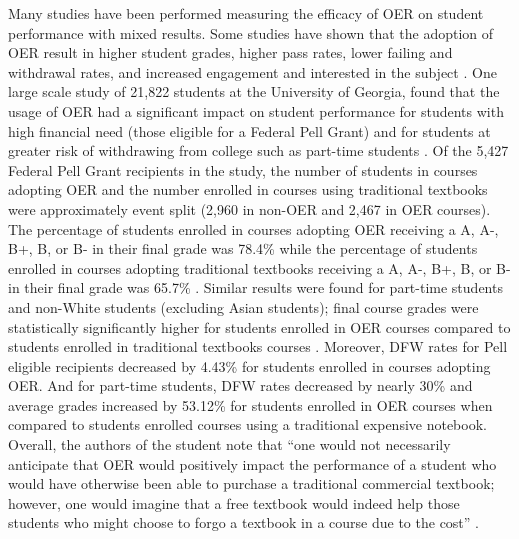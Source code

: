 \documentclass[11pt]{article}
\begin{document}
Many studies have been performed measuring the efficacy of OER on student performance with mixed results.  Some studies have shown that the adoption of OER result in higher student grades, higher pass rates, lower failing and withdrawal rates, and increased engagement and interested in the subject \cite{AF-MM:12, RF-RP-BD:15, LF-JH:15, RP:15, NP-DB:13, CB-WC-PH:18}.  One large scale study of 21,822 students at the University of Georgia, found that the usage of OER had a significant impact on student performance for students with high financial need (those eligible for a Federal Pell Grant) and for students at greater risk of withdrawing from college such as part-time students \cite{CB-WC-PH:18}.  Of the 5,427 Federal Pell Grant recipients in the study, the number of students in courses adopting OER and the number enrolled in courses using traditional textbooks were approximately event split (2,960 in non-OER and 2,467 in OER courses).  The percentage of students enrolled in courses adopting OER receiving a A, A-, B+, B, or B- in their final grade was 78.4\% while the percentage of students enrolled in courses adopting traditional textbooks receiving a A, A-, B+, B, or B- in their final grade was 65.7\% \cite[pg. 267]{CB-WC-PH:18}.  Similar results were found for part-time students and non-White students (excluding Asian students); final course grades were statistically significantly higher for students enrolled in OER courses compared to students enrolled in traditional textbooks courses \cite{CB-WC-PH:18}.  Moreover, DFW rates for Pell eligible recipients decreased by 4.43\% for students enrolled in courses adopting OER.  And for part-time students, DFW rates decreased by nearly 30\% and average grades increased by 53.12\% for students enrolled in OER courses when compared to students enrolled courses using a traditional expensive notebook.  Overall, the authors of the student note that ``one would not necessarily anticipate that OER would positively impact the performance of a student who would have otherwise been able to purchase a traditional commercial textbook; however, one would imagine that a free textbook would indeed help those students who might choose to forgo a textbook in a course due to the cost'' \cite{CB-WC-PH:18}.
\end{document}
